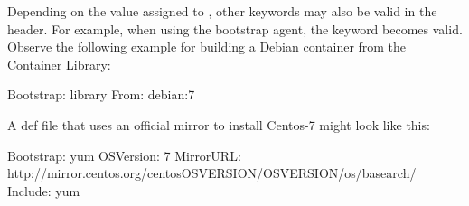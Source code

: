 \documentclass[letterpaper,10pt,english]{sphinxmanual}
\begin{document}
Depending on the value assigned to , other keywords may also be
valid in the header. For example, when using the  bootstrap agent,
the  keyword becomes valid. Observe the following example for building a
Debian container from the Container Library:

%
\begin{sphinxVerbatim}[commandchars=\\\{\}]
Bootstrap: library
From: debian:7
\end{sphinxVerbatim}

A def file that uses an official mirror to install Centos-7 might look like
this:

%
\begin{sphinxVerbatim}[commandchars=\\\{\}]
Bootstrap: yum
OSVersion: 7
MirrorURL: http://mirror.centos.org/centos\PYGZhy{}\PYGZpc{}\PYGZob{}OSVERSION\PYGZcb{}/\PYGZpc{}\PYGZob{}OSVERSION\PYGZcb{}/os/\PYGZdl{}basearch/
Include: yum
\end{sphinxVerbatim}
\end{document}
